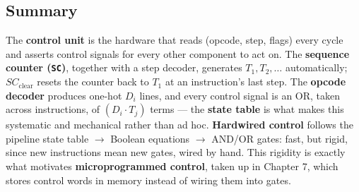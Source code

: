 \documentclass[11pt]{article}
\begin{document}
\subsection{Summary}

The \textbf{control unit} is the hardware that reads (opcode, step, flags) every cycle and asserts control signals for every other component to act on. The \textbf{sequence counter (\texttt{SC})}, together with a step decoder, generates $T_1, T_2, \dots$ automatically; $SC_{\text{clear}}$ resets the counter back to $T_1$ at an instruction's last step. The \textbf{opcode decoder} produces one-hot $D_i$ lines, and every control signal is an OR, taken across instructions, of $(D_i \cdot T_j)$ terms --- the \textbf{state table} is what makes this systematic and mechanical rather than ad hoc. \textbf{Hardwired control} follows the pipeline state table $\to$ Boolean equations $\to$ AND/OR gates: fast, but rigid, since new instructions mean new gates, wired by hand. This rigidity is exactly what motivates \textbf{microprogrammed control}, taken up in Chapter 7, which stores control words in memory instead of wiring them into gates.



\end{document}
